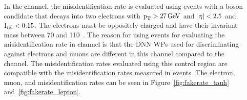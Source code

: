 In the \ehad channel, the \tauh misidentification rate is evaluated using events with a \PZ boson candidate that decays into two electrons with $\text{p}_\text{T} > 27 \,\text{Ge\hspace{-.08em}V}$ and $\lvert\eta\rvert < 2.5$ and $\text{I}_\text{rel} < 0.15$. The electrons must be oppositely charged and have their invariant mass between 70 and 110~\GeV. The reason for using \Zee events for evaluating the \tauh misidentification rate in \ehad channel is that the DNN WPs used for discriminating \tauh against electrons and muons are different in this channel compared to the \muhad channel. The misidentification rates evaluated using this control region are compatible with the misidentification rates measured in \Zmm events. The electron, muon, and \tauh misidentification rates can be seen in Figure~\ref{fig:fakerate_tauh} and~\ref{fig:fakerate_lepton}.

\begin{figure}[htbp]
  \centering
\end{figure}
